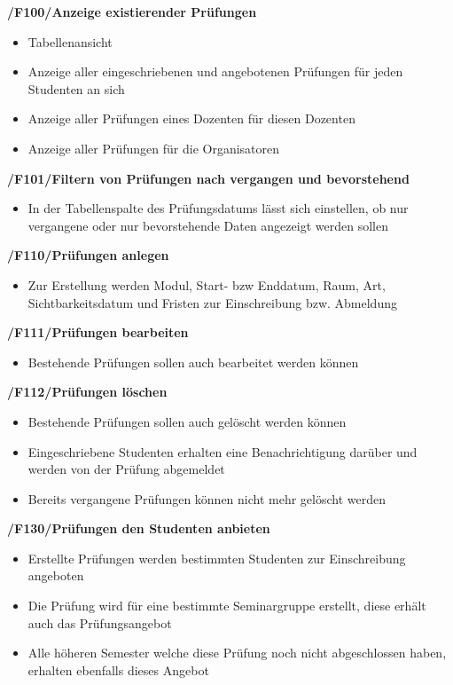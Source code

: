 \documentclass[12pt, a4paper]{scrartcl}
\newcommand{\ford}[2]{\textbf{/#1/\hspace{2em}#2}}
\begin{document}
\ford{F100}{Anzeige existierender Prüfungen}
\begin{itemize}
	\item Tabellenansicht
	\item Anzeige aller eingeschriebenen und angebotenen Prüfungen für jeden Studenten an sich
	\item Anzeige aller Prüfungen eines Dozenten für diesen Dozenten
	\item Anzeige aller Prüfungen für die Organisatoren
\end{itemize}

\ford{F101}{Filtern von Prüfungen nach vergangen und bevorstehend}
\begin{itemize}
	\item In der Tabellenspalte des Prüfungsdatums lässt sich einstellen, ob nur vergangene oder nur bevorstehende Daten angezeigt werden sollen
\end{itemize}

\ford{F110}{Prüfungen anlegen}
\begin{itemize}
	\item Zur Erstellung werden Modul, Start- bzw Enddatum, Raum, Art, Sichtbarkeitsdatum und Fristen zur Einschreibung bzw. Abmeldung
\end{itemize}

\ford{F111}{Prüfungen bearbeiten}
\begin{itemize}
	\item Bestehende Prüfungen sollen auch bearbeitet werden können
\end{itemize}

\ford{F112}{Prüfungen löschen}
\begin{itemize}
	\item Bestehende Prüfungen sollen auch gelöscht werden können
	\item Eingeschriebene Studenten erhalten eine Benachrichtigung darüber und werden von der Prüfung abgemeldet
	\item Bereits vergangene Prüfungen können nicht mehr gelöscht werden
\end{itemize}

\ford{F130}{Prüfungen den Studenten anbieten}
\begin{itemize}
	\item Erstellte Prüfungen werden bestimmten Studenten zur Einschreibung angeboten
	\item Die Prüfung wird für eine bestimmte Seminargruppe erstellt, diese erhält auch das Prüfungsangebot
	\item Alle höheren Semester welche diese Prüfung noch nicht abgeschlossen haben, erhalten ebenfalls dieses Angebot
\end{itemize}
\end{document}
